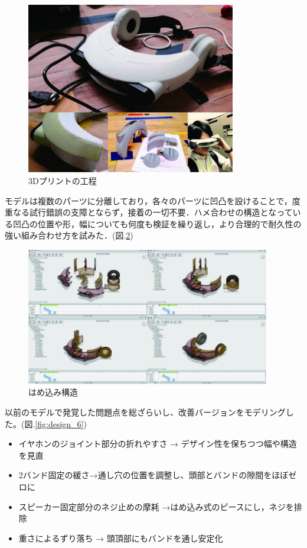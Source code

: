 \begin{figure}[h]
\begin{center}
\includegraphics[height=75mm]{images/hardware/design_4.jpg}
\end{center}
\caption{3Dプリントの工程}
\label{fig:design_4}
\end{figure}

モデルは複数のパーツに分離しており，各々のパーツに凹凸を設けることで，度重なる試行錯誤の支障とならず，接着の一切不要．ハメ合わせの構造となっている凹凸の位置や形，幅についても何度も検証を繰り返し，より合理的で耐久性の強い組み合わせ方を試みた．(図.\ref{fig:design_5})

\begin{figure}[h]
\begin{center}
\includegraphics[height=60mm]{images/hardware/design_5.jpg}
\end{center}
\caption{はめ込み構造}
\label{fig:design_5}
\end{figure}

以前のモデルで発覚した問題点を総ざらいし、改善バージョンをモデリングした。(図.\ref{fig:design_6})
\begin{itemize}
    \item イヤホンのジョイント部分の折れやすさ → デザイン性を保ちつつ幅や構造を見直
    \item 2バンド固定の緩さ→通し穴の位置を調整し、頭部とバンドの隙間をほぼゼロに
    \item スピーカー固定部分のネジ止めの摩耗 →はめ込み式のピースにし，ネジを排除
    \item 重さによるずり落ち → 頭頂部にもバンドを通し安定化
\end{itemize}

